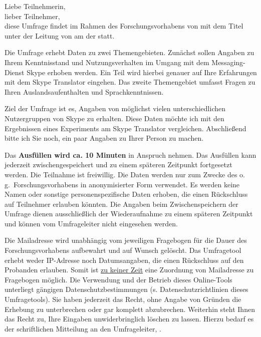 \begin{framed}
\label{App1:HinweisIndiv}

\noindent Liebe Teilnehmerin,\\

\noindent lieber Teilnehmer,\\

\noindent diese Umfrage findet im Rahmen des Forschungsvorhabens von \textit{\authorname} mit dem Titel \textit{\ttitle} unter der Leitung von \textit{\supname} am \textit{\deptname} der \textit{\univname} statt.

Die Umfrage erhebt Daten zu zwei Themengebieten. Zunächst sollen Angaben zu Ihrem Kenntnisstand und Nutzungsverhalten im Umgang mit dem Messaging-Dienst Skype erhoben werden. Ein Teil wird hierbei genauer auf Ihre Erfahrungen mit dem Skype Translator eingehen. Das zweite Themengebiet umfasst Fragen zu Ihren Auslandsaufenthalten und Sprachkenntnissen.

Ziel der Umfrage ist es, Angaben von möglichst vielen unterschiedlichen Nutzergruppen von Skype zu erhalten. Diese Daten möchte ich mit den Ergebnissen eines Experiments am Skype Translator vergleichen. Abschließend bitte ich Sie noch, ein paar Angaben zu Ihrer Person zu machen.

Das \textbf{Ausfüllen wird ca. 10 Minuten} in Anspruch nehmen. Das Ausfüllen kann jederzeit zwischengespeichert und zu einem späteren Zeitpunkt fortgesetzt werden. Die Teilnahme ist freiwillig. Die Daten werden nur zum Zwecke des o.\,g.\ Forschungsvorhabens in anonymisierter Form verwendet. Es werden keine Namen oder sonstige personenspezifische Daten erhoben, die einen Rückschluss auf Teilnehmer erlauben könnten. Die Angaben beim Zwischenspeichern der Umfrage dienen ausschließlich der Wiederaufnahme zu einem späteren Zeitpunkt und können vom Umfrageleiter nicht eingesehen werden.

Die Mailadresse wird unabhängig vom jeweiligen Fragebogen für die Dauer des Forschungsvorhabens aufbewahrt und auf Wunsch gelöscht. Das Umfragetool erhebt weder IP-Adresse noch Datumsangaben, die einen Rückschluss auf den Probanden erlauben. Somit ist \underline{zu keiner Zeit} eine Zuordnung von Mailadresse zu Fragebogen möglich. Die Verwendung und der Betrieb dieses Online-Tools unterliegt gängigen Datenschutzbestimmungen (s. Datenschutzrichtlinien dieses Umfragetools). Sie haben jederzeit das Recht, ohne Angabe von Gründen die Erhebung zu unterbrechen oder gar komplett abzubrechen. Weiterhin steht Ihnen das Recht zu, Ihre Eingaben unwiderbringlich löschen zu lassen. Hierzu bedarf es der schriftlichen Mitteilung an den Umfrageleiter, \authorname.


\end{framed}
